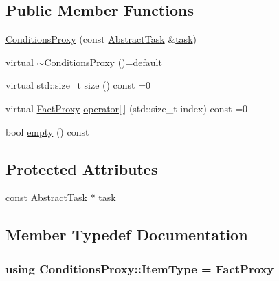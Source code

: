 \subsection*{Public Member Functions}
\begin{DoxyCompactItemize}
\item 
\hyperlink{classConditionsProxy_a0f4d3d6bb5b20b0689d094141967405a}{Conditions\-Proxy} (const \hyperlink{classAbstractTask}{Abstract\-Task} \&\hyperlink{classConditionsProxy_a8e8c904bd5dc370a7239ec7495dc0dfe}{task})
\item 
virtual \hyperlink{classConditionsProxy_a77219c9e840f9d542428539677296cf9}{$\sim$\-Conditions\-Proxy} ()=default
\item 
virtual std\-::size\-\_\-t \hyperlink{classConditionsProxy_af0710776571971659082f0140e4cdba3}{size} () const =0
\item 
virtual \hyperlink{classFactProxy}{Fact\-Proxy} \hyperlink{classConditionsProxy_a558d807927b992bad3728268b7e8a533}{operator\mbox{[}$\,$\mbox{]}} (std\-::size\-\_\-t index) const =0
\item 
bool \hyperlink{classConditionsProxy_a1ee8f0ef3bf2eed02add56d417a10566}{empty} () const 
\end{DoxyCompactItemize}
\subsection*{Protected Attributes}
\begin{DoxyCompactItemize}
\item 
const \hyperlink{classAbstractTask}{Abstract\-Task} $\ast$ \hyperlink{classConditionsProxy_a8e8c904bd5dc370a7239ec7495dc0dfe}{task}
\end{DoxyCompactItemize}


\subsection{Member Typedef Documentation}
\hypertarget{classConditionsProxy_a10602694ed5094da8bdc7e6e3167bf02}{
\subsubsection[{Item\-Type}]{\setlength{\rightskip}{0pt plus 5cm}using {\bf Conditions\-Proxy\-::\-Item\-Type} =  {\bf Fact\-Proxy}}}\label{classConditionsProxy_a10602694ed5094da8bdc7e6e3167bf02}


